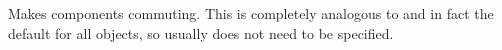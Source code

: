 
Makes components commuting. This is completely analogous
to  and in fact the default for all objects,
so usually does not need to be specified.


